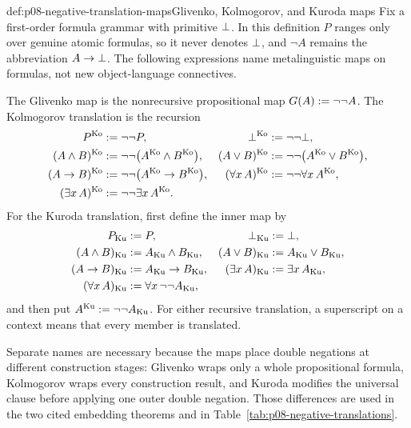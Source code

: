 \begin{hbdefinition}{def:p08-negative-translation-maps}{Glivenko, Kolmogorov, and Kuroda maps}
Fix a first-order formula grammar with primitive \(\bot\).  In this
definition \(P\) ranges only over genuine atomic formulas, so it never denotes
\(\bot\), and \(\neg A\) remains the abbreviation
\(A\to\bot\).  The following expressions name metalinguistic maps on
formulas, not new object-language connectives.

The Glivenko map is the nonrecursive propositional map
\(G(A)\mathrel{:=}\neg\neg A\).  The Kolmogorov translation is the recursion
\[
 \begin{aligned}
 P^{\mathrm{Ko}}&\mathrel{:=}\neg\neg P,
 &\bot^{\mathrm{Ko}}&\mathrel{:=}\neg\neg\bot,\\
 (A\land B)^{\mathrm{Ko}}&\mathrel{:=}
   \neg\neg\bigl(A^{\mathrm{Ko}}\land B^{\mathrm{Ko}}\bigr),
 &(A\lor B)^{\mathrm{Ko}}&\mathrel{:=}
   \neg\neg\bigl(A^{\mathrm{Ko}}\lor B^{\mathrm{Ko}}\bigr),\\
 (A\to B)^{\mathrm{Ko}}&\mathrel{:=}
   \neg\neg\bigl(A^{\mathrm{Ko}}\to B^{\mathrm{Ko}}\bigr),
 &(\forall x\,A)^{\mathrm{Ko}}&\mathrel{:=}
   \neg\neg\forall x\,A^{\mathrm{Ko}},\\
 (\exists x\,A)^{\mathrm{Ko}}&\mathrel{:=}
   \neg\neg\exists x\,A^{\mathrm{Ko}}.
 \end{aligned}
\]
For the Kuroda translation, first define the inner map by
\[
 \begin{aligned}
 P_{\mathrm{Ku}}&\mathrel{:=} P,
 &\bot_{\mathrm{Ku}}&\mathrel{:=}\bot,\\
 (A\land B)_{\mathrm{Ku}}&\mathrel{:=} A_{\mathrm{Ku}}\land B_{\mathrm{Ku}},
 &(A\lor B)_{\mathrm{Ku}}&\mathrel{:=} A_{\mathrm{Ku}}\lor B_{\mathrm{Ku}},\\
 (A\to B)_{\mathrm{Ku}}&\mathrel{:=} A_{\mathrm{Ku}}\to B_{\mathrm{Ku}},
 &(\exists x\,A)_{\mathrm{Ku}}&\mathrel{:=}\exists x\,A_{\mathrm{Ku}},\\
 (\forall x\,A)_{\mathrm{Ku}}&\mathrel{:=}
   \forall x\,\neg\neg A_{\mathrm{Ku}},
 \end{aligned}
\]
and then put \(A^{\mathrm{Ku}}\mathrel{:=}\neg\neg A_{\mathrm{Ku}}\).
For either recursive translation, a superscript on a context means that every
member is translated.

Separate names are necessary because the maps place double negations at
different construction stages: Glivenko wraps only a whole propositional
formula, Kolmogorov wraps every construction result, and Kuroda modifies the
universal clause before applying one outer double negation.  Those differences
are used in the two cited embedding theorems and in
Table~\ref{tab:p08-negative-translations}.
\end{hbdefinition}

